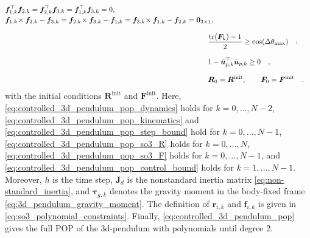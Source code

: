 \begin{subequations}
\begin{align}
\begin{aligned}
&\bm{f}_{1,k}^{\top}\bm{f}_{2,k}=\bm{f}_{2,k}^{\top}\bm{f}_{3,k}
=\bm{f}_{1,k}^{\top}\bm{f}_{3,k}=0,\\[-0.2em]
&\bm{f}_{1,k}\!\times \bm{f}_{2,k}-\bm{f}_{3,k}
=\bm{f}_{2,k}\!\times \bm{f}_{3,k}-\bm{f}_{1,k}
=\bm{f}_{3,k}\!\times \bm{f}_{1,k}-\bm{f}_{2,k}=\bm{0}_{3\times1},
\end{aligned}
\label{eq:controlled_3d_pendulum_pop_so3_F}
\\[0.8em]
&\hspace{-0.9em}\begin{aligned}
\frac{\operatorname{tr}(\bm{F}_k)-1}{2}
&\geq \cos(\Delta\theta_{\max})
\end{aligned},
\label{eq:controlled_3d_pendulum_pop_step_bound}
\\[0.8em]
&\hspace{-0.9em}\begin{aligned}
1-\bar{\bm{u}}_{p,k}^{\top}\bar{\bm{u}}_{p,k}&\geq0
\end{aligned},
\label{eq:controlled_3d_pendulum_pop_control_bound}
\\[0.8em]
&\hspace{-0.9em}\begin{aligned}
\bm{R}_0&=\bm{R}^{\mathrm{init}},
\qquad \bm{F}_0=\bm{F}^{\mathrm{init}}
\end{aligned}.
\label{eq:controlled_3d_pendulum_pop_initial}
\end{align}
\end{subequations}
\endgroup
with the initial conditions \(\bm{R}^{\mathrm{init}}\) and \(\bm{F}^{\mathrm{init}}\).
Here, \eqref{eq:controlled_3d_pendulum_pop_dynamics} holds for
\(k=0,\ldots,N-2\), \eqref{eq:controlled_3d_pendulum_pop_kinematics}
and \eqref{eq:controlled_3d_pendulum_pop_step_bound} hold for
\(k=0,\ldots,N-1\), \eqref{eq:controlled_3d_pendulum_pop_so3_R}
holds for \(k=0,\ldots,N\), \eqref{eq:controlled_3d_pendulum_pop_so3_F}
holds for \(k=0,\ldots,N-1\), and
\eqref{eq:controlled_3d_pendulum_pop_control_bound} holds for
\(k=1,\ldots,N-1\).
Moreover, \(h\) is the time step, \(\bm{J}_d\) is the nonstandard inertia matrix \eqref{eq:non-standard_inertia},
and $\bm{\tau}_{g,k}$ denotes the gravity moment in the body-fixed frame \eqref{eq:3d_pendulum_gravity_moment}.
The definition of \(\bm{r}_{i,k}\) and \(\bm{f}_{i,k}\) is given in \eqref{eq:so3_polynomial_constraints}.
Finally, \eqref{eq:controlled_3d_pendulum_pop} gives the full POP of the 3d-pendulum with 
polynomials until degree 2.

